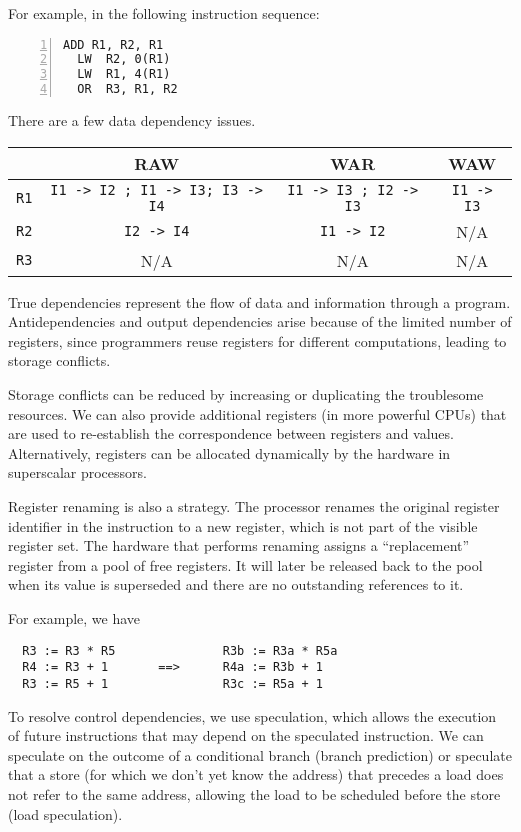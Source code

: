 For example, in the following instruction sequence:
\begin{Verbatim}[numbers=left,xleftmargin=5mm]
  ADD R1, R2, R1
  LW  R2, 0(R1)
  LW  R1, 4(R1)
  OR  R3, R1, R2
\end{Verbatim}

There are a few data dependency issues.
\begin{table}[H]
  \centering
  \begin{tabular}{c|c|c|c}
      \toprule
       & RAW & WAR & WAW  \\
    \midrule
      \verb|R1| & \verb|I1 -> I2 ; I1 -> I3; I3 -> I4| & \verb|I1 -> I3 ; I2 -> I3| & \verb|I1 -> I3|  \\
      \verb|R2| & \verb|I2 -> I4| & \verb|I1 -> I2| & N/A  \\
      \verb|R3| & N/A & N/A & N/A  \\
      \bottomrule
  \end{tabular}
\end{table}

True dependencies represent the flow of data and information through a program. Antidependencies and output dependencies arise because of the limited number of registers, since programmers reuse registers for different computations, leading to storage conflicts.

Storage conflicts can be reduced by increasing or duplicating the troublesome resources. We can also provide additional registers (in more powerful CPUs) that are used to re-establish the correspondence between registers and values. Alternatively, registers can be allocated dynamically by the hardware in superscalar processors.

Register renaming is also a strategy. The processor renames the original register identifier in the instruction to a new register, which is not part of the visible register set. The hardware that performs renaming assigns a ``replacement'' register from a pool of free registers. It will later be released back to the pool when its value is superseded and there are no outstanding references to it.

For example, we have 
\begin{verbatim}
  R3 := R3 * R5               R3b := R3a * R5a
  R4 := R3 + 1       ==>      R4a := R3b + 1
  R3 := R5 + 1                R3c := R5a + 1
\end{verbatim}

To resolve control dependencies, we use speculation, which allows the execution of future instructions that may depend on the speculated instruction. We can speculate on the outcome of a conditional branch (branch prediction) or speculate that a store (for which we don't yet know the address) that precedes a load does not refer to the same address, allowing the load to be scheduled before the store (load speculation).

